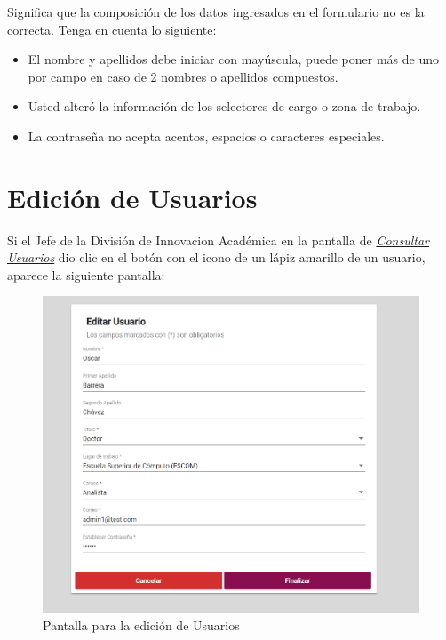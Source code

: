 \begin{itemize}
\begin{figure}[!hbtp]
                        \end{figure}
                    
                        Significa que la composición de los datos ingresados en el formulario no es la correcta. Tenga en cuenta lo siguiente:
                    
                        \begin{itemize}
                            \item El nombre y apellidos debe iniciar con mayúscula, puede poner más de uno por campo en caso de 2 nombres o apellidos compuestos.
                            \item Usted alteró la información de los selectores de cargo o zona de trabajo.
                            \item La contraseña no acepta acentos, espacios o caracteres especiales.
                        \end{itemize}
                    
                \end{itemize}

\newpage

            \hypertarget{editar-user}{}
            \section{Edición de Usuarios}
                Si el Jefe de la División de Innovacion Académica en la pantalla de \hyperlink{consultarUs}{\textit{Consultar Usuarios}} dio clic en el botón con el icono de un lápiz amarillo de un usuario, aparece la siguiente pantalla:
                
                \begin{figure}[!hbtp]
                    \centering
                    \hypertarget{editarUs}{\includegraphics[width=0.6\linewidth]{images/SP5/Editar-Usuario}}
                    \caption{Pantalla para la edición de Usuarios}
                    \label{editarrh}
                \end{figure}
                
